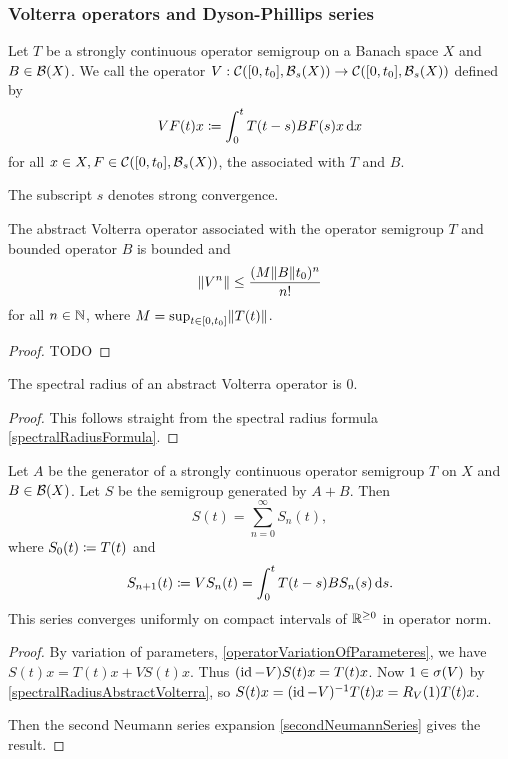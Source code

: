\subsubsection{Volterra operators and Dyson-Phillips series}
\begin{definition}
Let $T$ be a strongly continuous operator semigroup on a Banach space $X$ and $B\in\operatorname{\mathcal{B}}(X)$. We call the operator $V: \operatorname{\mathcal{C}}([0,t_0], \operatorname{\mathcal{B}}_s(X)) \to \operatorname{\mathcal{C}}([0,t_0], \operatorname{\mathcal{B}}_s(X))$ defined by
\[ VF(t)x \coloneqq \int_0^tT(t-s)BF(s)x\operatorname{d \!}{x} \]
for all $x\in X, F\in \operatorname{\mathcal{C}}([0,t_0], \operatorname{\mathcal{B}}_s(X))$,
the  associated with $T$ and $B$.
\end{definition}
The subscript $s$ denotes strong convergence.

\begin{lemma}
The abstract Volterra operator associated with the operator semigroup $T$ and bounded operator $B$ is bounded and
\[ \lVert V^n\rVert \leq \frac{(M\lVert B\rVert t_0)^n}{n!} \]
for all $n\in \mathbb{N}$, where $M = \sup_{t\in\interval{0,t_0}}\norm{T(t)}$.
\end{lemma}
\begin{proof}
TODO
\end{proof}
\begin{corollary} \label{spectralRadiusAbstractVolterra}
The spectral radius of an abstract Volterra operator is $0$.
\end{corollary}
\begin{proof}
This follows straight from the spectral radius formula \ref{spectralRadiusFormula}.
\end{proof}

\begin{theorem}
Let $A$ be the generator of a strongly continuous operator semigroup $T$ on $X$ and $B\in\operatorname{\mathcal{B}}(X)$. Let $S$ be the semigroup generated by $A+B$. Then
\[ S(t) = \sum_{n=0}^\infty S_n(t), \]
where $S_0(t) \coloneqq T(t)$ and
\[ S_{n+1}(t) \coloneqq VS_n(t) = \int_0^tT(t-s)BS_n(s)\operatorname{d \!}{s}. \]
This series converges uniformly on compact intervals of $\mathbb{R}^{\geq 0}$ in operator norm.
\end{theorem}
\begin{proof}
By variation of parameters, \ref{operatorVariationOfParameteres}, we have $S(t)x = T(t)x + VS(t)x$. Thus $(\operatorname{id} - V)S(t)x = T(t)x$. Now $1\in\sigma(V)$ by \ref{spectralRadiusAbstractVolterra}, so $S(t)x = (\operatorname{id} - V)^{-1}T(t)x = R_V(1)T(t)x$. 

Then the second Neumann series expansion \ref{secondNeumannSeries} gives the result.
\end{proof}

